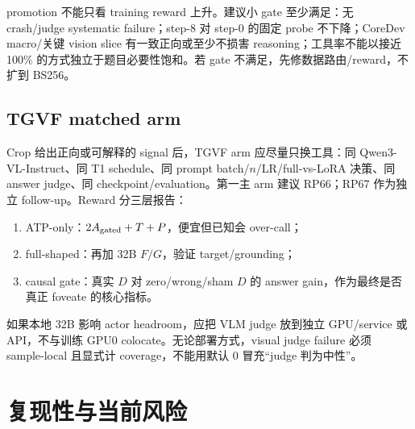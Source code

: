\documentclass[UTF8,twocolumn,10pt,a4paper]{ctexart}
\newcommand{\TGVF}{\textsf{TGVF}}
\begin{document}
promotion 不能只看 training reward 上升。建议小 gate 至少满足：无 crash/judge systematic failure；step-8 对 step-0 的固定 probe 不下降；CoreDev macro/关键 vision slice 有一致正向或至少不损害 reasoning；工具率不能以接近 100\% 的方式独立于题目必要性饱和。若 gate 不满足，先修数据路由/reward，不扩到 BS256。

\subsection{TGVF matched arm}

Crop 给出正向或可解释的 signal 后，\TGVF{} arm 应尽量只换工具：同 Qwen3-VL-Instruct、同 T1 schedule、同 prompt batch/$n$/LR/full-vs-LoRA 决策、同 answer judge、同 checkpoint/evaluation。第一主 arm 建议 RP66；RP67 作为独立 follow-up。Reward 分三层报告：
\begin{enumerate}
  \item ATP-only：$2A_{\rm gated}+T+P$，便宜但已知会 over-call；
  \item full-shaped：再加 32B $F/G$，验证 target/grounding；
  \item causal gate：真实 $D$ 对 zero/wrong/sham $D$ 的 answer gain，作为最终是否真正 foveate 的核心指标。
\end{enumerate}

如果本地 32B 影响 actor headroom，应把 VLM judge 放到独立 GPU/service 或 API，不与训练 GPU0 colocate。无论部署方式，visual judge failure 必须 sample-local 且显式计 coverage，不能用默认 0 冒充“judge 判为中性”。

\section{复现性与当前风险}
\end{document}
